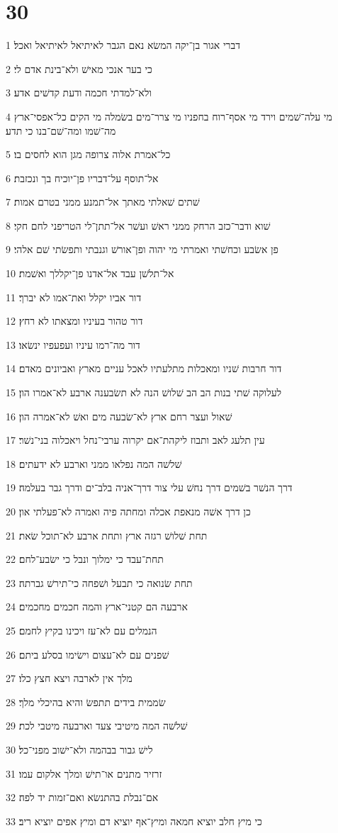 \chapter{30}

\par 1 דברי אגור בן־יקה המשׂא נאם הגבר לאיתיאל לאיתיאל ואכל׃
\par 2 כי בער אנכי מאישׁ ולא־בינת אדם לי׃
\par 3 ולא־למדתי חכמה ודעת קדשׁים אדע׃
\par 4 מי עלה־שׁמים וירד מי אסף־רוח בחפניו מי צרר־מים בשׂמלה מי הקים כל־אפסי־ארץ מה־שׁמו ומה־שׁם־בנו כי תדע׃
\par 5 כל־אמרת אלוה צרופה מגן הוא לחסים בו׃
\par 6 אל־תוסף על־דבריו פן־יוכיח בך ונכזבת׃
\par 7 שׁתים שׁאלתי מאתך אל־תמנע ממני בטרם אמות׃
\par 8 שׁוא ודבר־כזב הרחק ממני ראשׁ ועשׁר אל־תתן־לי הטריפני לחם חקי׃
\par 9 פן אשׂבע וכחשׁתי ואמרתי מי יהוה ופן־אורשׁ וגנבתי ותפשׂתי שׁם אלהי׃
\par 10 אל־תלשׁן עבד אל־אדנו פן־יקללך ואשׁמת׃
\par 11 דור אביו יקלל ואת־אמו לא יברך׃
\par 12 דור טהור בעיניו ומצאתו לא רחץ׃
\par 13 דור מה־רמו עיניו ועפעפיו ינשׂאו׃
\par 14 דור חרבות שׁניו ומאכלות מתלעתיו לאכל עניים מארץ ואביונים מאדם׃
\par 15 לעלוקה שׁתי בנות הב הב שׁלושׁ הנה לא תשׂבענה ארבע לא־אמרו הון׃
\par 16 שׁאול ועצר רחם ארץ לא־שׂבעה מים ואשׁ לא־אמרה הון׃
\par 17 עין תלעג לאב ותבוז ליקהת־אם יקרוה ערבי־נחל ויאכלוה בני־נשׁר׃
\par 18 שׁלשׁה המה נפלאו ממני וארבע לא ידעתים׃
\par 19 דרך הנשׁר בשׁמים דרך נחשׁ עלי צור דרך־אניה בלב־ים ודרך גבר בעלמה׃
\par 20 כן דרך אשׁה מנאפת אכלה ומחתה פיה ואמרה לא־פעלתי און׃
\par 21 תחת שׁלושׁ רגזה ארץ ותחת ארבע לא־תוכל שׂאת׃
\par 22 תחת־עבד כי ימלוך ונבל כי ישׂבע־לחם׃
\par 23 תחת שׂנואה כי תבעל ושׁפחה כי־תירשׁ גברתה׃
\par 24 ארבעה הם קטני־ארץ והמה חכמים מחכמים׃
\par 25 הנמלים עם לא־עז ויכינו בקיץ לחמם׃
\par 26 שׁפנים עם לא־עצום וישׂימו בסלע ביתם׃
\par 27 מלך אין לארבה ויצא חצץ כלו׃
\par 28 שׂממית בידים תתפשׂ והיא בהיכלי מלך׃
\par 29 שׁלשׁה המה מיטיבי צעד וארבעה מיטבי לכת׃
\par 30 לישׁ גבור בבהמה ולא־ישׁוב מפני־כל׃
\par 31 זרזיר מתנים או־תישׁ ומלך אלקום עמו׃
\par 32 אם־נבלת בהתנשׂא ואם־זמות יד לפה׃
\par 33 כי מיץ חלב יוציא חמאה ומיץ־אף יוציא דם ומיץ אפים יוציא ריב׃

